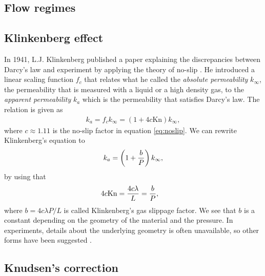 \subsection{Flow regimes}


\subsection{Klinkenberg effect}
In 1941, L.J. Klinkenberg published a paper explaining the discrepancies between Darcy's law and experiment by applying the theory of no-slip \cite{klinkenberg1941permeability}. He introduced a linear scaling function $f_c$ that relates what he called the \textit{absolute permeability} $k_\infty$, the permeability that is measured with a liquid or a high density gas, to the \textit{apparent permeability} $k_a$ which is the permeability that satisfies Darcy's law. The relation is given as
\begin{align}
	k_a = f_c k_\infty = \left(1 + 4c\text{Kn}\right)k_\infty,
\end{align}
where $c\approx 1.11$ is the no-slip factor in equation \eqref{eq:noslip}. We can rewrite Klinkenberg's equation to 
\begin{align}
	k_a = \left(1 + {b\over P}\right)k_\infty,
\end{align}
by using that
\begin{align}
	4c\text{Kn} &= {4c\lambda \over L} = {b\over P},
\end{align}
where $b=4c\lambda P / L$ is called Klinkenberg's gas slippage factor. We see that $b$ is a constant depending on the geometry of the material and the pressure. In experiments, details about the underlying geometry is often unavailable, so other forms have been suggested \cite{ziarani2012knudsen}.
\subsection{Knudsen's correction}

